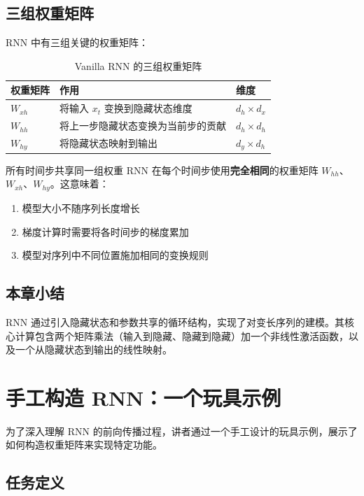 \documentclass[a4paper]{article}
\begin{document}
\subsection{三组权重矩阵}

RNN 中有三组关键的权重矩阵：

\begin{table}[H]
\centering
\begin{tabular}{lll}
\toprule
\textbf{权重矩阵} & \textbf{作用} & \textbf{维度} \\
\midrule
$W_{xh}$ & 将输入 $x_t$ 变换到隐藏状态维度 & $d_h \times d_x$ \\
$W_{hh}$ & 将上一步隐藏状态变换为当前步的贡献 & $d_h \times d_h$ \\
$W_{hy}$ & 将隐藏状态映射到输出 & $d_y \times d_h$ \\
\bottomrule
\end{tabular}
\caption{Vanilla RNN 的三组权重矩阵}
\end{table}

\begin{warningbox}{所有时间步共享同一组权重}
RNN 在每个时间步使用\textbf{完全相同}的权重矩阵 $W_{hh}$、$W_{xh}$、$W_{hy}$。这意味着：
\begin{enumerate}
    \item 模型大小不随序列长度增长
    \item 梯度计算时需要将各时间步的梯度累加
    \item 模型对序列中不同位置施加相同的变换规则
\end{enumerate}
\end{warningbox}

\subsection{本章小结}

RNN 通过引入隐藏状态和参数共享的循环结构，实现了对变长序列的建模。其核心计算包含两个矩阵乘法（输入到隐藏、隐藏到隐藏）加一个非线性激活函数，以及一个从隐藏状态到输出的线性映射。


\section{手工构造 RNN：一个玩具示例}

为了深入理解 RNN 的前向传播过程，讲者通过一个手工设计的玩具示例，展示了如何构造权重矩阵来实现特定功能。

\subsection{任务定义}
\end{document}
